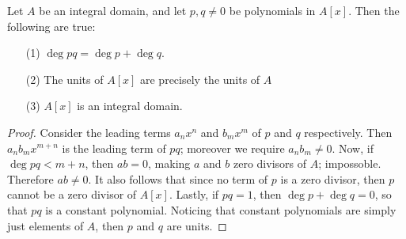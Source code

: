 \begin{theorem}\label{1.2.2}
    Let $A$ be an integral domain, and let  $p,q \neq 0$ be polynomials in
    $A[x]$. Then the following are true:
    \begin{enumerate}
        \item[(1)] $\deg{pq}=\deg{p}+\deg{q}$.

        \item[(2)] The units of $A[x]$ are precisely the units of $A$

        \item[(3)] $A[x]$ is an integral domain.
    \end{enumerate}
\end{theorem}
\begin{proof}
    Consider the leading terms $a_nx^n$ and  $b_mx^m$ of  $p$ and  $q$
    respectively. Then  $a_nb_mx^{m+n}$ is the leading term of $pq$; moreover we
    require $a_nb_m \neq 0$. Now, if $\deg{pq}<m+n$, then $ab=0$, making $a$ and
    $b$ zero divisors of  $A$; impossoble. Therefore  $ab \neq 0$. It also
    follows that since no term of $p$ is a zero divisor, then $p$ cannot be a
    zero divisor of  $A[x]$. Lastly, if $pq=1$, then $\deg{p}+\deg{q}=0$, so
    that $pq$ is a constant polynomial. Noticing that constant polynomials are
    simply just elements of $A$, then $p$ and $q$ are units.
\end{proof}
